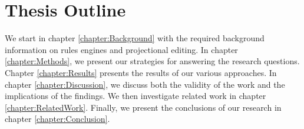 \section{Thesis Outline}

We start in chapter \ref{chapter:Background} with the required background information on rules engines and projectional editing.
In chapter \ref{chapter:Methods}, we present our strategies for answering the research questions.
Chapter \ref{chapter:Results} presents the results of our various approaches.
In chapter \ref{chapter:Discussion}, we discuss both the validity of the work and the implications of the findings.
We then investigate related work in chapter \ref{chapter:RelatedWork}.
Finally, we present the conclusions of our research in chapter \ref{chapter:Conclusion}.
